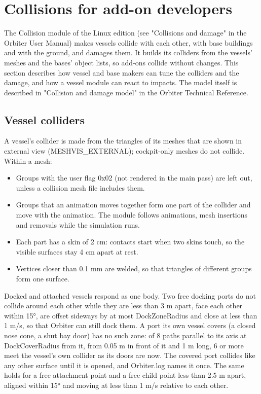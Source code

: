\documentclass[Orbiter Developer Manual.tex]{subfiles}
\begin{document}
\section{Collisions for add-on developers}
\label{sec:collision_dev}
\begin{sloppypar}
The Collision module of the Linux edition (see "Collisions and damage" in the Orbiter User Manual) makes vessels collide with each other, with base buildings and with the ground, and damages them. It builds its colliders from the vessels' meshes and the bases' object lists, so add-ons collide without changes. This section describes how vessel and base makers can tune the colliders and the damage, and how a vessel module can react to impacts. The model itself is described in "Collision and damage model" in the Orbiter Technical Reference.


\subsection{Vessel colliders}
A vessel's collider is made from the triangles of its meshes that are shown in external view (MESHVIS\_\allowbreak EXTERNAL); cockpit-only meshes do not collide. Within a mesh:

\begin{itemize}
\item Groups with the user flag 0x02 (not rendered in the main pass) are left out, unless a collision mesh file includes them.
\item Groups that an animation moves together form one part of the collider and move with the animation. The module follows animations, mesh insertions and removals while the simulation runs.
\item Each part has a skin of 2 cm: contacts start when two skins touch, so the visible surfaces stay 4 cm apart at rest.
\item Vertices closer than 0.1 mm are welded, so that triangles of different groups form one surface.
\end{itemize}

\noindent
Docked and attached vessels respond as one body. Two free docking ports do not collide around each other while they are less than 3 m apart, face each other within 15°, are offset sideways by at most DockZoneRadius and close at less than 1 m/s, so that Orbiter can still dock them. A port its own vessel covers (a closed nose cone, a shut bay door) has no such zone: of 8 paths parallel to its axis at DockCoverRadius from it, from 0.05 m in front of it and 1 m long, 6 or more meet the vessel's own collider as its doors are now. The covered port collides like any other surface until it is opened, and Orbiter.log names it once. The same holds for a free attachment point and a free child point less than 2.5 m apart, aligned within 15° and moving at less than 1 m/s relative to each other.



\end{sloppypar}
\end{document}
